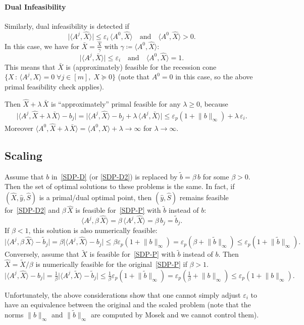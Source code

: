 \documentclass[10pt, a4paper]{article}
\newcommand{\suchthat}{\,:\,}
\newcommand{\abs}[1]{\lvert{#1}\rvert}
\newcommand{\define}{\coloneqq}
\newcommand{\norm}[1]{\lVert{#1}\rVert}
\newcommand{\skal}[2]{\langle{#1},{#2}\rangle}
\begin{document}
\paragraph{Dual Infeasibility}

Similarly, dual infeasibility is detected if
\[
\abs{\skal{A^j}{\hat{X}}} \leq \varepsilon_i\, \skal{A^0}{\hat{X}}
\quad\text{and}\quad \skal{A^0}{\hat{X}} > 0.
\]
In this case, we have for $\bar{X} = \frac{\hat{X}}{\gamma}$ with
$\gamma \define \skal{A^0}{\hat{X}}$:
\[
\abs{\skal{A^j}{\bar{X}}} \leq \varepsilon_i
\quad\text{and}\quad \skal{A^0}{\hat{X}} = 1.
\]
This means that $\bar{X}$ is (approximately) feasible for the recession
cone $\{X \suchthat \skal{A^j}{X} = 0\; \forall j \in [m],\; X \succeq 0\}$
(note that $A^0 = 0$ in this case, so the above primal feasibility check
applies).

Then $\hat{X} + \lambda\, \bar{X}$ is ``approximately'' primal feasible
for any $\lambda \geq 0$, because
\begin{align*}
  \abs{\skal{A^j}{\hat{X} + \lambda\, \bar{X}} - b_j} =
  \abs{\skal{A^j}{\hat{X}} - b_j + \lambda\, \skal{A^j}{\bar{X}}}
  \leq \varepsilon_p (1 + \norm{b}_{\infty}) + \lambda\, \varepsilon_i.
\end{align*}
Moreover
$\skal{A^0}{\hat{X} + \lambda\, \bar{X}} = \skal{A^0}{\hat{X}} + \lambda \to \infty$ for
$\lambda \to \infty$.



\subsection{Scaling}

Assume that $b$ in~\eqref{SDP-D} (or \eqref{SDP-D2}) is replaced by
$\tilde{b} = \beta\, b$ for some $\beta > 0$. Then the set of optimal
solutions to these problems is the same. In fact, if
$(\hat{X},\hat{y},\hat{S})$ is a primal/dual optimal point, then
$(\hat{y},\hat{S})$ remains feasible for~\eqref{SDP-D2} and $\beta\, \hat{X}$ is
feasible for~\eqref{SDP-P} with $\tilde{b}$ instead of $b$:
\[
\skal{A^j}{\beta\, \hat{X}} = \beta\, \skal{A^j}{\hat{X}} = \beta\,b_j = \tilde{b}_j.
\]
If $\beta < 1$, this solution is also numerically feasible:
\[
\abs{\skal{A^j}{\beta\, \hat{X}} - \tilde{b}_j}
= \beta \abs{\skal{A^j}{\hat{X}} - b_j}
\leq \beta \varepsilon_p (1 + \norm{b}_\infty)
= \varepsilon_p (\beta + \norm{\tilde{b}}_\infty) \leq \varepsilon_p (1 + \norm{\tilde{b}}_\infty).
\]
Conversely, assume that $\tilde{X}$ is feasible for~\eqref{SDP-P} with
$\tilde{b}$ instead of $b$. Then $\hat{X} = \tilde{X}/\beta$ is numerically
feasible for the original~\eqref{SDP-P} if $\beta > 1$.
\[
\abs{\skal{A^j}{\hat{X}} - b_j}
= \tfrac{1}{\beta} \abs{\skal{A^j}{\tilde{X}} - \tilde{b}_j}
\leq \tfrac{1}{\beta} \varepsilon_p (1 + \norm{\tilde{b}}_\infty)
= \varepsilon_p (\tfrac{1}{\beta} + \norm{b}_\infty) \leq \varepsilon_p (1 + \norm{b}_\infty).
\]

Unfortunately, the above considerations show that one cannot simply adjust
$\varepsilon_i$ to have an equivalence between the original and the scaled
problem (note that the norms $\norm{b}_{\infty}$ and
$\norm{\tilde{b}}_{\infty}$ are computed by Mosek and we cannot control
them).
\end{document}
